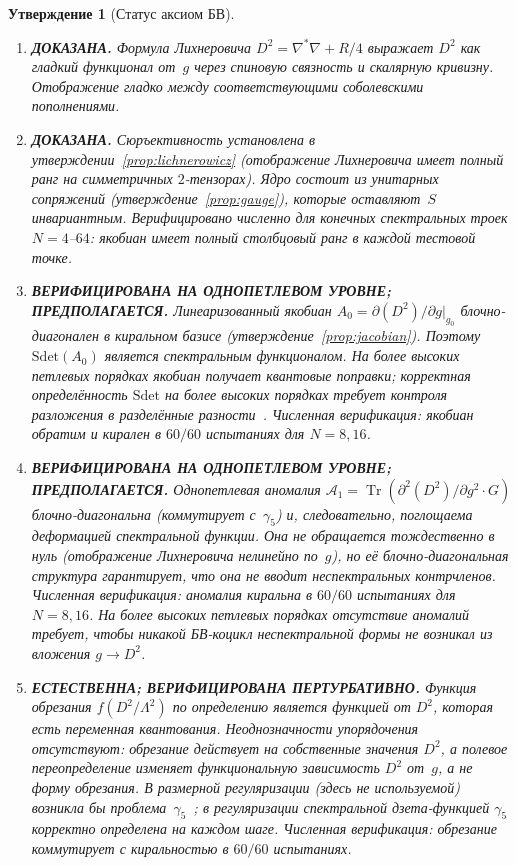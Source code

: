\documentclass[12pt,a4paper]{article}
\newtheorem{proposition}[theorem]{Утверждение}
\theoremstyle{definition}
\theoremstyle{remark}
\newcommand{\Tr}{\operatorname{Tr}}
\newcommand{\Lam}{\Lambda}
\begin{document}
\begin{proposition}[Статус аксиом БВ]
\label{prop:bv_status}
\mbox{}
\begin{enumerate}[\bfseries BV-1:]
  \item \textbf{ДОКАЗАНА.}
    Формула Лихнеровича $D^2 = \nabla^*\nabla + R/4$ выражает $D^2$
    как гладкий функционал от~$g$ через спиновую связность и скалярную
    кривизну.  Отображение гладко между соответствующими соболевскими
    пополнениями.
  \item \textbf{ДОКАЗАНА.}
    Сюръективность установлена в утверждении~\ref{prop:lichnerowicz}
    (отображение Лихнеровича имеет полный ранг на симметричных
    $2$-тензорах).  Ядро состоит из унитарных сопряжений
    (утверждение~\ref{prop:gauge}), которые оставляют~$S$ инвариантным.
    Верифицировано численно для конечных спектральных троек
    $N = 4$--$64$: якобиан имеет полный столбцовый ранг в каждой
    тестовой точке.
  \item \textbf{ВЕРИФИЦИРОВАНА НА ОДНОПЕТЛЕВОМ УРОВНЕ; ПРЕДПОЛАГАЕТСЯ.}
    Линеаризованный якобиан $A_0 = \partial(D^2)/\partial g|_{g_0}$
    блочно-диагонален в киральном базисе
    (утверждение~\ref{prop:jacobian}).  Поэтому $\mathrm{Sdet}(A_0)$
    является спектральным функционалом.  На более высоких петлевых
    порядках якобиан получает квантовые поправки;
    корректная определённость $\mathrm{Sdet}$ на более высоких
    порядках требует контроля разложения в разделённые
    разности~\cite{vanNuland:2021oneloop}.  Численная верификация:
    якобиан обратим и кирален в $60/60$ испытаниях для $N = 8, 16$.
  \item \textbf{ВЕРИФИЦИРОВАНА НА ОДНОПЕТЛЕВОМ УРОВНЕ; ПРЕДПОЛАГАЕТСЯ.}
    Однопетлевая аномалия $\mathcal{A}_1 = \Tr(\partial^2(D^2)/\partial g^2 \cdot G)$
    блочно-диагональна (коммутирует с~$\gamma_5$) и, следовательно,
    поглощаема деформацией спектральной функции.  Она не обращается
    тождественно в нуль (отображение Лихнеровича нелинейно по~$g$),
    но её блочно-диагональная структура гарантирует, что она не вводит
    неспектральных контрчленов.  Численная верификация: аномалия
    киральна в $60/60$ испытаниях для $N = 8, 16$.
    На более высоких петлевых порядках отсутствие аномалий требует,
    чтобы никакой БВ-коцикл неспектральной формы не возникал из
    вложения $g \to D^2$.
  \item \textbf{ЕСТЕСТВЕННА; ВЕРИФИЦИРОВАНА ПЕРТУРБАТИВНО.}
    Функция обрезания $f(D^2/\Lam^2)$ по определению является
    функцией от $D^2$, которая есть переменная квантования.
    Неоднозначности упорядочения отсутствуют: обрезание действует на
    собственные значения $D^2$, а полевое переопределение изменяет
    функциональную зависимость $D^2$ от~$g$, а не форму обрезания.
    В размерной регуляризации (здесь не используемой) возникла бы
    проблема~$\gamma_5$~\cite{Jegerlehner:2000dz}; в регуляризации
    спектральной дзета-функцией $\gamma_5$ корректно определена на
    каждом шаге.  Численная верификация: обрезание коммутирует с
    киральностью в $60/60$ испытаниях.
\end{enumerate}
\end{proposition}
\end{document}
